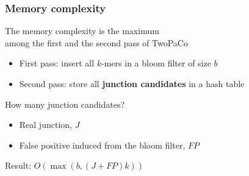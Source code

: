 \begin{frame}
  
	\frametitle{Memory complexity}

  \centering
	
	The memory complexity is the maximum \\ among the first and the second pass of TwoPaCo \\
	
	\medskip
	
	\begin{itemize}
	  \item First pass: insert all $k$-mers in a bloom filter of size $b$
	  \item Second pass: store all \textbf{junction candidates} in a hash table
	\end{itemize}
	
	\medskip
	
	How many junction candidates?
	
	\begin{itemize}
	  \item Real junction, $J$
	  \item False positive induced from the bloom filter, $FP$
	\end{itemize}

	\medskip
	
	Result: $O( \max(b, (J+FP)k) )$
	
	
\end{frame}


